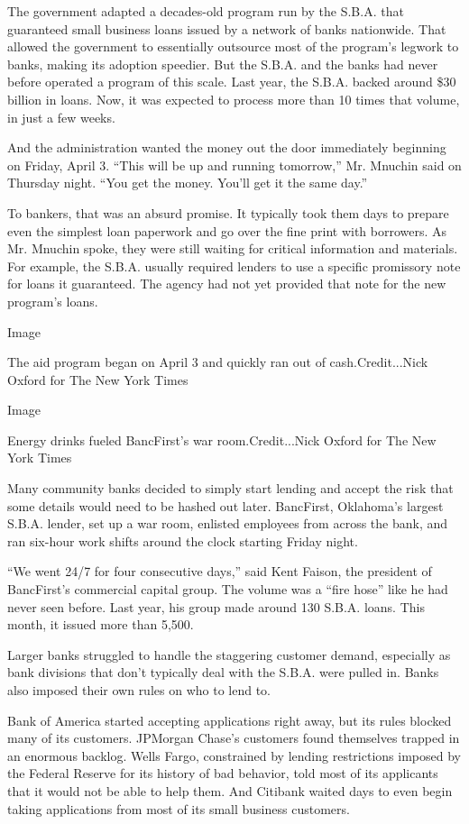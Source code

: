 The government adapted a decades-old program run by the S.B.A. that
guaranteed small business loans issued by a network of banks nationwide.
That allowed the government to essentially outsource most of the
program's legwork to banks, making its adoption speedier. But the S.B.A.
and the banks had never before operated a program of this scale. Last
year, the S.B.A. backed around \$30 billion in loans. Now, it was
expected to process more than 10 times that volume, in just a few weeks.

And the administration wanted the money out the door immediately
beginning on Friday, April 3. ``This will be up and running tomorrow,''
Mr. Mnuchin said on Thursday night. ``You get the money. You'll get it
the same day.''

To bankers, that was an absurd promise. It typically took them days to
prepare even the simplest loan paperwork and go over the fine print with
borrowers. As Mr. Mnuchin spoke, they were still waiting for critical
information and materials. For example, the S.B.A. usually required
lenders to use a specific promissory note for loans it guaranteed. The
agency had not yet provided that note for the new program's loans.

Image

The aid program began on April 3 and quickly ran out of
cash.Credit...Nick Oxford for The New York Times

Image

Energy drinks fueled BancFirst's war room.Credit...Nick Oxford for The
New York Times

Many community banks decided to simply start lending and accept the risk
that some details would need to be hashed out later. BancFirst,
Oklahoma's largest S.B.A. lender, set up a war room, enlisted employees
from across the bank, and ran six-hour work shifts around the clock
starting Friday night.

``We went 24/7 for four consecutive days,'' said Kent Faison, the
president of BancFirst's commercial capital group. The volume was a
``fire hose'' like he had never seen before. Last year, his group made
around 130 S.B.A. loans. This month, it issued more than 5,500.

Larger banks struggled to handle the staggering customer demand,
especially as bank divisions that don't typically deal with the S.B.A.
were pulled in. Banks also imposed their own rules on who to lend to.

Bank of America started accepting applications right away, but its rules
blocked many of its customers. JPMorgan Chase's customers found
themselves trapped in an enormous backlog. Wells Fargo, constrained by
lending restrictions imposed by the Federal Reserve for its history of
bad behavior, told most of its applicants that it would not be able to
help them. And Citibank waited days to even begin taking applications
from most of its small business customers.

